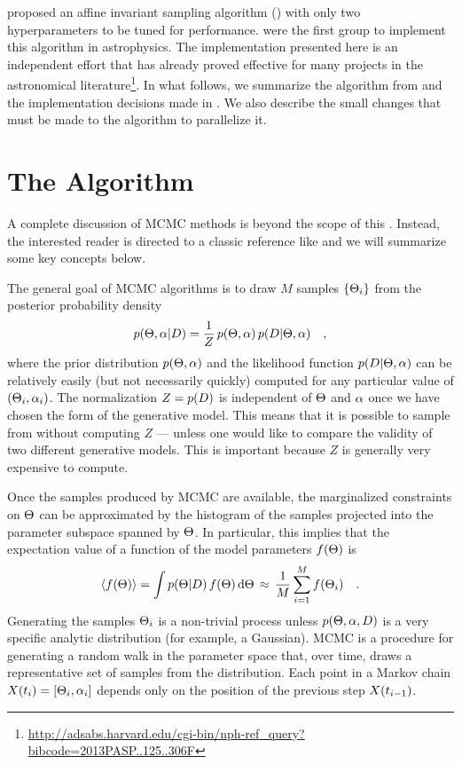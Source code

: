 \citet[][hereafter ]{Goodman:2010} proposed an affine
invariant sampling algorithm () with only two hyperparameters to be
tuned for performance. \citet{Hou:2012} were the first group to implement this
algorithm in astrophysics. The implementation presented here is
an independent effort that has already proved effective for many projects in
the astronomical
literature\footnote{\url{http://adsabs.harvard.edu/cgi-bin/nph-ref_query?bibcode=2013PASP..125..306F}}.
In what follows, we summarize the
algorithm from  and the implementation
decisions made in \this. We also describe the small changes
that must be made to the algorithm to parallelize it.

\section{The Algorithm}

A complete discussion of MCMC methods is beyond the scope of this \paper.
Instead, the interested reader is directed to a classic reference like
\citet{MacKay:2003} and we will summarize some key concepts below.

The general goal of MCMC algorithms is to draw $M$ samples
$\{ \Theta_i \}$ from
the posterior probability density
\begin{equation}
    p(\Theta, \alpha | D) = \frac{1}{Z}\,p(\Theta, \alpha)
            \, p(D | \Theta, \alpha) \quad,
\end{equation}
where the prior distribution $p(\Theta, \alpha)$ and the likelihood
function $p(D|\Theta,\alpha)$ can be relatively easily (but not
necessarily quickly) computed for any particular value of
$(\Theta_i, \alpha_i)$.  The normalization $Z=p(D)$ is
independent of $\Theta$ and $\alpha$ once we have chosen the form of the
generative model. This means that it is possible
to sample from \pr{\model, \nuisance | \data} without computing $Z$ ---
unless one would like to compare the validity of two different generative
models. This is important because $Z$ is generally very expensive to
compute.

Once the samples
produced by MCMC are available, the marginalized constraints on $\Theta$
can be approximated by
the histogram of the samples projected into the parameter subspace spanned
by $\Theta$. In particular, this implies that the
expectation value of a function of the model parameters $f(\Theta)$ is
\begin{equation}
    \left<f(\Theta)\right> = \int
    p(\Theta|D)
    \, f(\Theta) \, \mathrm{d}\Theta
    \,\approx\, \frac{1}{M} \sum_{i=1} ^M f(\Theta_i) \quad.
\end{equation}
Generating the samples $\Theta_i$ is a non-trivial process unless
$p(\Theta, \alpha, D)$ is a very specific analytic distribution
(for example, a Gaussian). MCMC is a procedure for generating a random walk
in the parameter space that, over time, draws a representative set
of samples from the distribution. Each point in a Markov chain
$X (t_i) = [\Theta_i, \alpha_i]$
depends only on the position of the previous step $X (t_{i-1})$.

